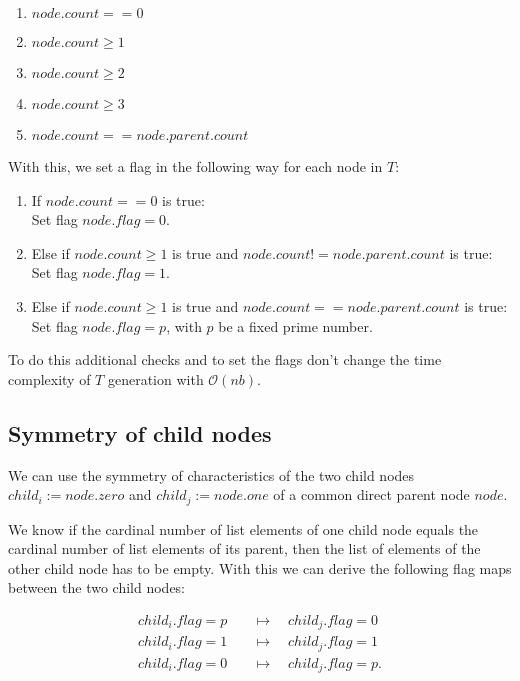 \documentclass{article}
\newtheorem*{theorem A}{Theorem A}
\newtheorem*{theorem B}{N\"olker's Theorem}
\theoremstyle{remark}
\theoremstyle{remark}
\begin{document}
\begin{enumerate}
    \item $node.count == 0$
    \item $node.count \geq 1$
    \item $node.count \geq 2$
    \item $node.count \geq 3$
    \item $node.count == node.parent.count$
\label{enum:checks}
\end{enumerate}

With this, we set a flag in the following way for each node in $T$:

\begin{enumerate}
    \item If $node.count == 0$ is true:\\
        Set flag $node.flag = 0$.
    \item Else if $node.count \geq 1$ is true and $node.count != node.parent.count$ is true:\\
        Set flag $node.flag = 1$.
    \item Else if $node.count \geq 1$ is true and $node.count == node.parent.count$ is true:\\
        Set flag $node.flag = p$, with $p$ be a fixed prime number.
\label{enum:flags}
\end{enumerate}

To do this additional checks and to set the flags don't change the time complexity of $T$ generation with $\mathcal{O}\left(nb\right)$.
\subsection{Symmetry of child nodes}
\label{ss:symmetryofchildnodes}
We can use the symmetry of characteristics of the two child nodes $child_{i} := node.zero$ and $child_{j} := node.one$ of a common direct parent node $node$.

We know if the cardinal number of list elements of one child node equals the cardinal number of list elements of its parent, then the list of elements of the other child node has to be empty. With this we can derive the following flag maps between the two child nodes:

\begin{equation}
    \begin{split}
        child_{i}.flag = p \quad &\mapsto \quad child_{j}.flag = 0\\
        child_{i}.flag = 1 \quad &\mapsto \quad child_{j}.flag = 1\\
        child_{i}.flag = 0 \quad &\mapsto \quad child_{j}.flag = p.
    \label{eq:flagmaps}
    \end{split}
\end{equation}
\end{document}
